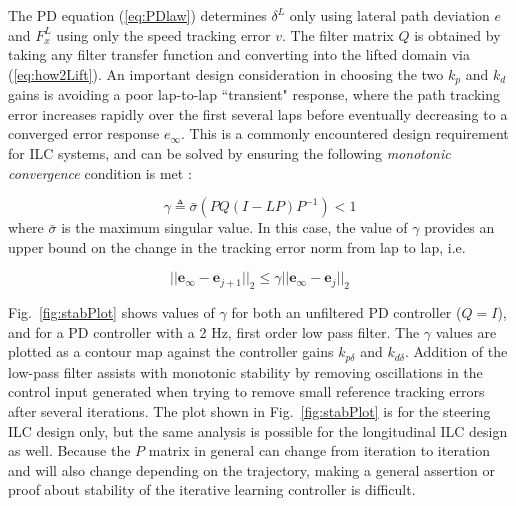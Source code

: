 \documentclass[9pt,shortpaper,twoside,web]{ieeecolor}
\begin{document}
 The PD equation (\ref{eq:PDlaw}) determines $\delta^L$ only using lateral path deviation $e$ and $F^L_x$ using only the speed tracking error $v$. The filter matrix $Q$ is obtained by taking any filter transfer function and converting into the lifted domain via (\ref{eq:how2Lift}).  An important design consideration in choosing the two $k_p$ and $k_d$ gains is avoiding a poor lap-to-lap ``transient" response, where the path tracking error increases rapidly over the first several laps before
eventually decreasing to a converged error response $e_\infty$. This is a commonly encountered design requirement
for ILC systems, and can be solved by ensuring the following \textit{monotonic convergence} condition is met \cite{bristow}:

\begin{equation}
	\gamma \triangleq \bar{\sigma}(PQ(I-LP)P^{-1}) < 1
	\label{eq:MS}
\end{equation}
where $\bar{\sigma}$ is the maximum singular value. In this case, the value of $\gamma$ provides an upper bound on the change
 in the tracking error norm from lap to lap, i.e. 
 
\begin{equation}
	||\mathbf{e}_\infty - \mathbf{e}_{j+1}||_2 \leq \gamma ||\mathbf{e}_\infty-\mathbf{e}_j||_2
\end{equation}

Fig.~\ref{fig:stabPlot} shows values of $\gamma$ for both an unfiltered PD controller ($Q = I$), and for a PD controller with a 2 Hz, first order low pass filter. The $\gamma$ values are plotted as a
contour map against the controller gains $k_{p\delta}$ and $k_{d\delta}$. Addition of the low-pass filter
assists with monotonic stability by removing oscillations in the control input generated when trying to remove small reference tracking errors after several iterations.
The plot shown in Fig.~\ref{fig:stabPlot} is for the steering ILC design only, but the same analysis is possible for the longitudinal
ILC design as well. Because the $P$ matrix in general can change from iteration to iteration and will also
 change depending on the trajectory, making a general assertion or proof about stability of the iterative learning controller is difficult. 
\end{document}
